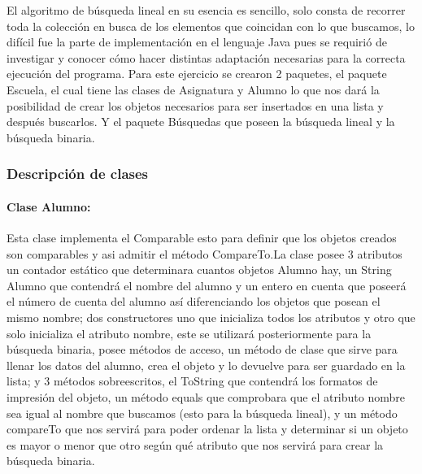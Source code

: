 \documentclass{report}
\begin{document}
El algoritmo de búsqueda lineal en su esencia es sencillo, solo consta de recorrer toda la colección en busca de los elementos que coincidan con lo que buscamos, lo difícil fue la parte de implementación en el lenguaje Java pues se requirió de investigar y conocer cómo hacer distintas adaptación necesarias para la correcta ejecución del programa.
Para este ejercicio se crearon 2 paquetes, el paquete Escuela, el cual tiene las clases de Asignatura y Alumno lo que nos dará la posibilidad de crear los objetos necesarios para ser insertados en una lista y después buscarlos.
Y el paquete Búsquedas que poseen la búsqueda lineal y la búsqueda binaria.
\subsubsection{Descripción de clases}
\paragraph{Clase Alumno:}
Esta clase implementa el Comparable esto para definir que los objetos creados son comparables y asi admitir el método CompareTo.La clase posee 3 atributos un contador estático que determinara cuantos objetos Alumno hay, un String Alumno que contendrá el nombre del alumno y un entero en cuenta que poseerá el número de cuenta del alumno así diferenciando los objetos que posean el mismo nombre; dos constructores uno que inicializa todos los atributos y otro que solo inicializa el atributo nombre, este se utilizará posteriormente para la búsqueda binaria, posee métodos de acceso, un método de clase que sirve para llenar los datos del alumno, crea el objeto y lo devuelve para ser guardado en la lista; y 3 métodos sobreescritos, el ToString que contendrá los formatos de impresión del objeto, un método equals que comprobara que el atributo nombre sea igual al nombre que buscamos (esto para la búsqueda lineal), y un método compareTo que nos servirá para poder ordenar la lista y determinar si un objeto es mayor o menor que otro según qué atributo que nos servirá para crear la búsqueda binaria.
\end{document}
